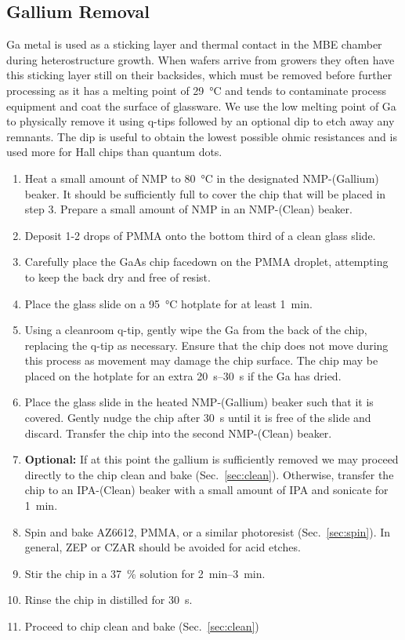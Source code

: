 \subsection{Gallium Removal}
\label{sec:garem}
Ga metal is used as a sticking layer and thermal contact in the MBE chamber during heterostructure growth. When wafers
arrive from growers they often have this sticking layer still on their backsides, which must be removed before further processing
as it has a melting point of \SI{29}{\celsius} and tends to contaminate process equipment and coat the surface of glassware.
We use the low melting point of Ga to physically remove it using q-tips followed by an optional  dip to etch away any remnants.
The  dip is useful to obtain the lowest possible ohmic resistances and is used more for Hall chips than quantum dots.
\begin{enumerate}
    \item Heat a small amount of NMP to \SI{80}{\celsius} in the designated NMP-(Gallium) beaker. It should be sufficiently full to cover the chip that will be placed in step 3. Prepare a small amount of NMP in an NMP-(Clean) beaker.
    \item Deposit 1-2 drops of PMMA onto the bottom third of a clean glass slide.
    \item Carefully place the GaAs chip facedown on the PMMA droplet, attempting to keep the back dry and free of resist.
    \item Place the glass slide on a \SI{95}{\celsius} hotplate for at least \SI{1}{\minute}.
    \item Using a cleanroom q-tip, gently wipe the Ga from the back of the chip, replacing the q-tip as necessary. Ensure that the chip does not move during this process as movement may damage the chip surface. The chip may be placed on the hotplate for an extra \SIrange{20}{30}{\second} if the Ga has dried.
    \item Place the glass slide in the heated NMP-(Gallium) beaker such that it is covered. Gently nudge the chip after \SI{30}{\second} until it is free of the slide and discard. Transfer the chip into the second NMP-(Clean) beaker.
    \item \textbf{Optional:} If at this point the gallium is sufficiently removed we may proceed directly to the chip clean and bake (Sec.~\ref{sec:clean}). Otherwise, transfer the chip to an IPA-(Clean) beaker with a small amount of IPA and sonicate for \SI{1}{\minute}.
    \item Spin and bake AZ6612, PMMA, or a similar photoresist (Sec.~\ref{sec:spin}). In general, ZEP or CZAR should be avoided for acid etches.
    \item Stir the chip in a \SI{37}{\percent}  solution for \SIrange{2}{3}{\minute}.
    \item Rinse the chip in distilled  for \SI{30}{\second}.
    \item Proceed to chip clean and bake (Sec.~\ref{sec:clean})
\end{enumerate}

